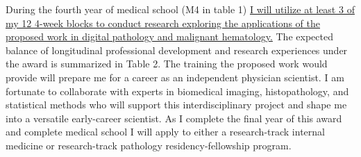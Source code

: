 \documentclass{NIHGrant}
\begin{document}
During the fourth year of medical school (M4 in table 1) \uline{I will utilize at least 3 of my 12 4-week blocks to conduct research exploring the applications of the proposed work in digital pathology and malignant hematology.} The expected balance of longitudinal professional development and research experiences under the award is summarized in Table 2. The training the proposed work would provide will prepare me for a career as an independent physician scientist. I am fortunate to collaborate with experts in biomedical imaging, histopathology, and statistical methods who will support this interdisciplinary project and shape me into a versatile early-career scientist. As I complete the final year of this award and complete medical school I will apply to either a research-track internal medicine or research-track pathology residency-fellowship program.



\end{document}
